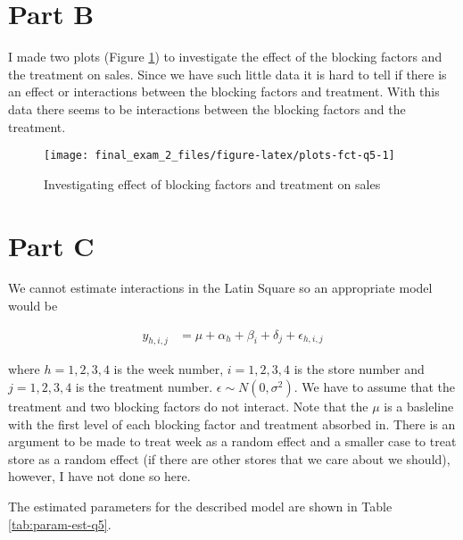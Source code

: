 \documentclass[]{book}
\begin{document}
\hypertarget{part-b-4}{%
\section{Part B}\label{part-b-4}}

I made two plots (Figure \ref{fig:plots-fct-q5}) to investigate the effect of the blocking factors and the treatment on sales. Since we have such little data it is hard to tell if there is an effect or interactions between the blocking factors and treatment. With this data there seems to be interactions between the blocking factors and the treatment.

\begin{figure}

{\centering \texttt{[image: final\_exam\_2\_files/figure-latex/plots-fct-q5-1]} 

}

\caption{Investigating effect of blocking factors and treatment on sales}\label{fig:plots-fct-q5}
\end{figure}

\hypertarget{part-c-4}{%
\section{Part C}\label{part-c-4}}

We cannot estimate interactions in the Latin Square so an appropriate model would be

\begin{align}
  y_{h, i, j} &= \mu + \alpha_h + \beta_i + \delta_j + \epsilon_{h, i, j}
\end{align}

where \(h = 1, 2, 3, 4\) is the week number, \(i = 1, 2, 3, 4\) is the store number and \(j = 1, 2, 3, 4\) is the treatment number. \(\epsilon \sim N(0, \sigma^2)\). We have to assume that the treatment and two blocking factors do not interact. Note that the \(\mu\) is a basleline with the first level of each blocking factor and treatment absorbed in. There is an argument to be made to treat week as a random effect and a smaller case to treat store as a random effect (if there are other stores that we care about we should), however, I have not done so here.

The estimated parameters for the described model are shown in Table \ref{tab:param-est-q5}.
\end{document}
